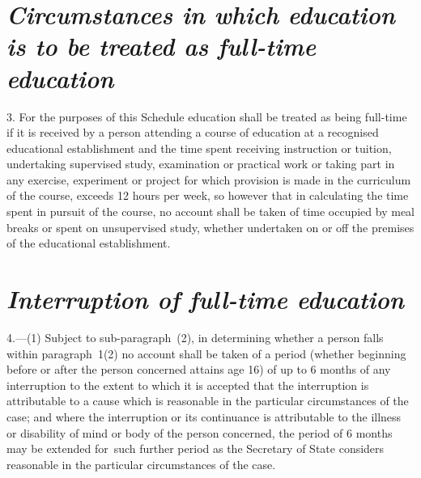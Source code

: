 \documentclass[a4paper,12pt]{article}
\begin{document}
\section*{\itshape\sloppy Circumstances in which education is to be treated as full-time education}

3.  For the purposes of 
this Schedule  %
education shall be treated as being full-time if it is received by a person attending a course of education at a recognised educational establishment and the time spent receiving instruction or tuition, undertaking supervised study, examination or practical work or taking part in any exercise, experiment or project for which provision is made in the curriculum of the course, exceeds 12 hours per week, so however that in calculating the time spent in pursuit of the course, no account shall be taken of time occupied by meal breaks or spent on unsupervised study, whether undertaken on or off the premises of the educational establishment.


\section*{\itshape Interruption of full-time education}

4.—(1) Subject to sub-paragraph~(2), in determining whether a person falls within 
paragraph~1(2)  %
no account shall be taken of a period (whether beginning before or after the person concerned attains age 16) of up to 6 months of any interruption to the extent to which it is accepted that the interruption is attributable to a cause which is reasonable in the particular circumstances of the case; and where the interruption or its continuance is attributable to the illness or disability of mind or body of the person concerned, the period of 6 months may be extended for~such further period as 
the Secretary of State  %
considers reasonable in the particular circumstances of the case.

%
\end{document}

